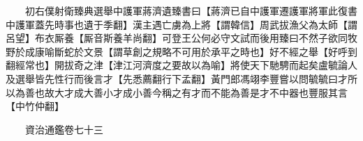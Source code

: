 　　初右僕射衛臻典選舉中護軍蔣濟遺臻書曰【蔣濟已自中護軍遷護軍將軍此復書中護軍蓋先時事也遺于季翻】漢主遇亡虜為上將【謂韓信】周武拔漁父為太師【謂呂望】布衣厮養【厮音斯養羊尚翻】可登王公何必守文試而後用臻曰不然子欲同牧野於成康喻斷蛇於文景【謂草創之規略不可用於承平之時也】好不經之舉【好呼到翻經常也】開拔奇之津【津江河濟度之要故以為喻】將使天下馳騁而起矣盧毓論人及選舉皆先性行而後言才【先悉薦翻行下孟翻】黃門郎馮翊李豐嘗以問毓毓曰才所以為善也故大才成大善小才成小善今稱之有才而不能為善是才不中器也豐服其言【中竹仲翻】

　　資治通鑑卷七十三


    


 


 



 

 
  







 


　　
　　
　
　
　


　　

　















	
	









































 
  



















 





 












  
  
  

 





